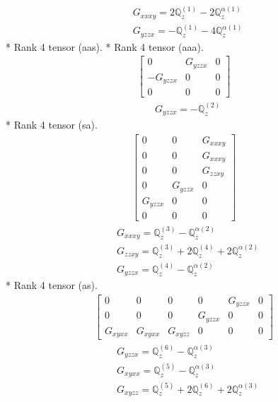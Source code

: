 \documentclass[fleqn,8pt,landscape]{jsarticle}
\begin{document}
\begin{align*}
& G_{xxxy} = 2 \mathbb{Q}_{z}^{(1)} - 2 \mathbb{Q}_{z}^{\alpha(1)} \\
& G_{yzzx} = - \mathbb{Q}_{z}^{(1)} - 4 \mathbb{Q}_{z}^{\alpha(1)}
\end{align*}
* Rank 4 tensor (aas).
* Rank 4 tensor (aaa).
\begin{align*}
\begin{bmatrix} 0 & G_{yzzx} & 0 \\ - G_{yzzx} & 0 & 0 \\ 0 & 0 & 0 \end{bmatrix}
\end{align*}
\begin{align*}
& G_{yzzx} = - \mathbb{Q}_{z}^{(2)}
\end{align*}
* Rank 4 tensor (sa).
\begin{align*}
\begin{bmatrix} 0 & 0 & G_{xxxy} \\ 0 & 0 & G_{xxxy} \\ 0 & 0 & G_{zzxy} \\ 0 & G_{yzzx} & 0 \\ G_{yzzx} & 0 & 0 \\ 0 & 0 & 0 \end{bmatrix}
\end{align*}
\begin{align*}
& G_{xxxy} = \mathbb{Q}_{z}^{(3)} - \mathbb{Q}_{z}^{\alpha(2)} \\
& G_{zzxy} = \mathbb{Q}_{z}^{(3)} + 2 \mathbb{Q}_{z}^{(4)} + 2 \mathbb{Q}_{z}^{\alpha(2)} \\
& G_{yzzx} = \mathbb{Q}_{z}^{(4)} - \mathbb{Q}_{z}^{\alpha(2)}
\end{align*}
* Rank 4 tensor (as).
\begin{align*}
\begin{bmatrix} 0 & 0 & 0 & 0 & G_{yzzx} & 0 \\ 0 & 0 & 0 & G_{yzzx} & 0 & 0 \\ G_{xyxx} & G_{xyxx} & G_{xyzz} & 0 & 0 & 0 \end{bmatrix}
\end{align*}
\begin{align*}
& G_{yzzx} = \mathbb{Q}_{z}^{(6)} - \mathbb{Q}_{z}^{\alpha(3)} \\
& G_{xyxx} = \mathbb{Q}_{z}^{(5)} - \mathbb{Q}_{z}^{\alpha(3)} \\
& G_{xyzz} = \mathbb{Q}_{z}^{(5)} + 2 \mathbb{Q}_{z}^{(6)} + 2 \mathbb{Q}_{z}^{\alpha(3)}
\end{align*}
\end{document}
